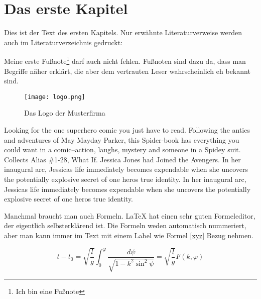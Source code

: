 
\chapter{Das erste Kapitel}
Dies ist der Text des ersten Kapitels. Nur erwähnte Literaturverweise werden auch im Literaturverzeichnis gedruckt: \cites[S.12 ff]{baumgartner:2002}[S.1-3]{dreyfus:1980}

Meine erste Fußnote\footnote{Ich bin eine Fußnote} darf auch nicht fehlen. Fußnoten sind dazu da, dass man Begriffe näher erklärt, die aber dem vertrauten Leser wahrscheinlich eh bekannt sind. 

\begin{figure}[h]
\centering
\texttt{[image: logo.png]}
\caption{Das Logo der Musterfirma\footnotemark}
\end{figure}



Looking for the one superhero comic you just have to read. Following the antics and adventures of May Mayday Parker, this Spider-book has everything you could want in a comic--action, laughs, mystery and someone in a Spidey suit. Collects Alias \#1-28, What If. Jessica Jones had Joined the Avengers. In her inaugural arc, Jessicas life immediately becomes expendable when she uncovers the potentially explosive secret of one heros true identity. In her inaugural arc, Jessicas life immediately becomes expendable when she uncovers the potentially explosive secret of one heros true identity.

Manchmal braucht man auch Formeln. LaTeX hat einen sehr guten Formeleditor, der eigentlich selbsterklärend ist. Die Formeln weden automatisch nummeriert, aber man kann immer im Text mit einem Label wie Formel \ref{xyz} Bezug nehmen.

\begin{equation}
t-t_{0}=\sqrt{\frac{l}{g}}\int_{0}^{\varphi}{\frac{d\psi}{\sqrt{1-k^{2}\sin^{2} {\psi}}}} = \sqrt{\frac{l}{g}} F(k,\varphi)
\label{xyz}
\end{equation}

